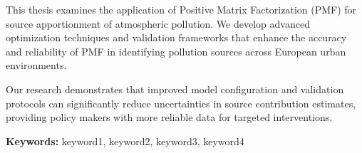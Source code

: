 \noindent This thesis examines the application of Positive Matrix Factorization (PMF) for source apportionment of atmospheric pollution. We develop advanced optimization techniques and validation frameworks that enhance the accuracy and reliability of PMF in identifying pollution sources across European urban environments.

Our research demonstrates that improved model configuration and validation protocols can significantly reduce uncertainties in source contribution estimates, providing policy makers with more reliable data for targeted interventions.

\vspace{0.5cm}

\noindent \textbf{Keywords:} keyword1, keyword2, keyword3, keyword4
